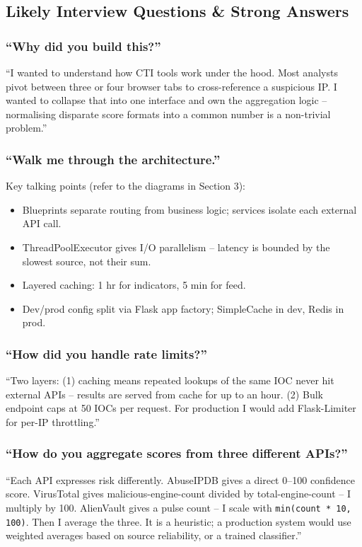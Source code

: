 \documentclass[11pt,a4paper]{article}
\begin{document}
\subsection{Likely Interview Questions \& Strong Answers}

\subsubsection{``Why did you build this?''}
``I wanted to understand how CTI tools work under the hood. Most analysts pivot between three or four browser tabs to cross-reference a suspicious IP. I wanted to collapse that into one interface and own the aggregation logic -- normalising disparate score formats into a common number is a non-trivial problem.''

\subsubsection{``Walk me through the architecture.''}
Key talking points (refer to the diagrams in Section 3):
\begin{itemize}
  \item Blueprints separate routing from business logic; services isolate each external API call.
  \item ThreadPoolExecutor gives I/O parallelism -- latency is bounded by the slowest source, not their sum.
  \item Layered caching: 1 hr for indicators, 5 min for feed.
  \item Dev/prod config split via Flask app factory; SimpleCache in dev, Redis in prod.
\end{itemize}

\subsubsection{``How did you handle rate limits?''}
``Two layers: (1) caching means repeated lookups of the same IOC never hit external APIs -- results are served from cache for up to an hour. (2) Bulk endpoint caps at 50 IOCs per request. For production I would add Flask-Limiter for per-IP throttling.''

\subsubsection{``How do you aggregate scores from three different APIs?''}
``Each API expresses risk differently. AbuseIPDB gives a direct 0--100 confidence score. VirusTotal gives malicious-engine-count divided by total-engine-count -- I multiply by 100. AlienVault gives a pulse count -- I scale with \texttt{min(count * 10, 100)}. Then I average the three. It is a heuristic; a production system would use weighted averages based on source reliability, or a trained classifier.''
\end{document}
